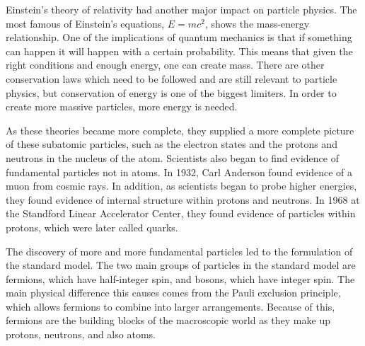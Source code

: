 Einstein's theory of relativity had another major impact on particle physics. The most famous of Einstein's equations, $E = mc^2$, shows the mass-energy relationship. One of the implications of quantum mechanics is that if something can happen it will happen with a certain probability. This means that given the right conditions and enough energy, one can create mass. There are other conservation laws which need to be followed and are still relevant to particle physics, but conservation of energy is one of the biggest limiters. In order to create more massive particles, more energy is needed. 

As these theories became more complete, they supplied a more complete picture of these subatomic particles, such as the electron states and the protons and neutrons in the nucleus of the atom. Scientists also began to find evidence of fundamental particles not in atoms. In 1932, Carl Anderson found evidence of a muon from cosmic rays. In addition, as scientists began to probe higher energies, they found evidence of internal structure within protons and neutrons. In 1968 at the Standford Linear Accelerator Center, they found evidence of particles within protons, which were later called quarks.

The discovery of more and more fundamental particles led to the formulation of the standard model. The two main groups of particles in the standard model are fermions, which have half-integer spin, and bosons, which have integer spin. The main physical difference this causes comes from the Pauli exclusion principle, which allows fermions to combine into larger arrangements. Because of this, fermions are the building blocks of the macroscopic world as they make up protons, neutrons, and also atoms.   

